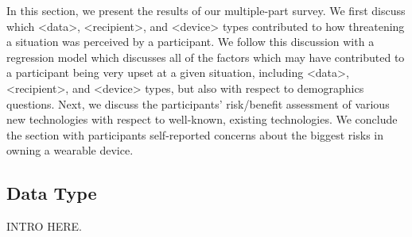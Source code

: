 \documentclass{acm_proc_article-sp}
\begin{document}

In this section, we present the results of our multiple-part survey. We first discuss which <data>, <recipient>, and <device> types contributed to how threatening a situation was perceived by a participant. We follow this discussion with a regression model which discusses all of the factors which may have contributed to a participant being very upset at a given situation, including <data>, <recipient>, and <device> types, but also with respect to demographics questions. Next, we discuss the participants' risk/benefit assessment of various new technologies with respect to well-known, existing technologies. We conclude the section with participants self-reported concerns about the biggest risks in owning a wearable device.  

\subsection{Data Type}
INTRO HERE. 
\end{document}
